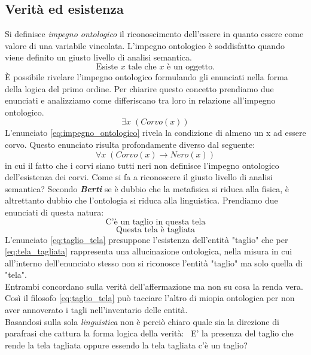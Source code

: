 \documentclass[a4paper,12pt]{article}
\begin{document}
\subsection{Verità ed esistenza} %
Si definisce \textit{impegno ontologico} il riconoscimento dell'essere in quanto essere come valore di una
variabile vincolata. L'impegno ontologico è soddisfatto quando viene definito un giusto livello di analisi
semantica.
\begin{equation}
    \mbox{Esiste $x$ tale che $x$ è un oggetto.}
    \label{eq:esistenza_oggetto}
\end{equation}
È possibile rivelare l'impegno ontologico formulando gli enunciati nella forma della logica del primo ordine. Per chiarire 
questo concetto prendiamo due enunciati e analizziamo come differiscano tra loro in relazione all'impegno ontologico.
\begin{equation}
    \exists x \; (Corvo(x))
    \label{eq:impegno_ontologico}
\end{equation}
L'enunciato \eqref{eq:impegno_ontologico} rivela la condizione di almeno un x ad essere corvo. Questo enunciato risulta
profondamente diverso dal seguente:
\begin{equation}
    \forall x \; (Corvo(x) \rightarrow Nero(x))
    \label{eq:quant_universale}
\end{equation}
in cui il fatto che i corvi siano tutti neri non definisce l'impegno ontologico dell'esistenza dei corvi.
Come si fa a riconoscere il giusto livello di analisi semantica?
Secondo \textbf{\textit{Berti}} se è dubbio che la metafisica si riduca alla fisica, è altrettanto dubbio che 
l'ontologia si riduca alla linguistica. Prendiamo due enunciati di questa natura:
\begin{equation}
    \mbox{C'è un taglio in questa tela}
    \label{eq:taglio_tela}
\end{equation}
\begin{equation}
    \mbox{Questa tela è tagliata}
    \label{eq:tela_tagliata}
\end{equation}
L'enunciato \eqref{eq:taglio_tela} presuppone l'esistenza dell'entità "taglio" che per \eqref{eq:tela_tagliata}
rappresenta una allucinazione ontologica, nella misura in cui all'interno dell'enunciato stesso non si riconosce
l'entità "taglio" ma solo quella di "tela".
\\ Entrambi concordano sulla verità dell'affermazione ma non su cosa la renda vera. Così il filosofo \eqref{eq:taglio_tela}
può tacciare l'altro di miopia ontologica per non aver annoverato i tagli nell'inventario delle entità.
\\ Basandosi sulla sola \textit{linguistica} non è perciò chiaro quale sia la direzione di parafrasi che cattura 
la forma logica della verità:
\ E' la presenza del taglio che rende la tela tagliata oppure essendo la tela tagliata c'è un taglio?
\end{document}
